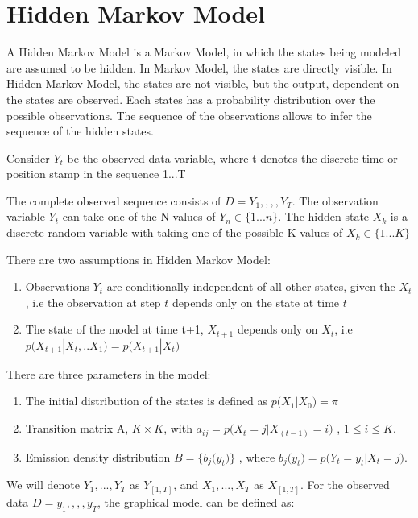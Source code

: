 \documentclass{article} %
\begin{document}
\section{Hidden Markov Model}
\label{HMM}

A Hidden Markov Model is a Markov Model, in which the states being modeled are assumed to be hidden. In Markov Model, the states are directly visible. In Hidden Markov Model, the states are not visible, but the output, dependent on the states are observed. Each states has a probability distribution over the possible observations. The sequence of the observations allows to infer the sequence of the hidden states. 

Consider \(Y_t\) be the observed data variable, where t denotes the discrete time or position stamp in the sequence 1...T

The complete observed sequence consists of \(D ={Y_1,,,,Y_T}\). The observation variable $Y_t$ can take one of the N values of \(Y_n \in \{1...n\}\). The hidden state \(X_k\) is a discrete random variable with taking one of the possible K values of \(X_k \in \{1...K\}\)

There are two assumptions in Hidden Markov Model:
\begin{enumerate}
\item Observations $Y_t$ are conditionally independent of all other states, given the \(X_t\), i.e the observation at step \(t\) depends only on the state at time \(t\)
\item The state of the model at time t+1, \(X_{t+1}\) depends only on \(X_t\), i.e 
\( p\big(X_{t+1}|X_t,..X_1\big) = p\big(X_{t+1}|X_t\big) \)
\end{enumerate}

There are three parameters in the model:
\begin{enumerate}
\item The initial distribution of the states is defined as \(p\big(X_1|X_0 \big) = \pi\)
\item Transition matrix A, \(K \times K \), with \(a_{ij} = p\big(X_t=j|X_(t-1)=i\big)\) , \(1\leq i \leq K \).
\item Emission density distribution \(B = \{b_{j}\big(y_t\big)\}\) , where \(b_{j}\big(y_t\big) = p\big(Y_t=y_t|X_t=j\big)\).
\end{enumerate}

We will denote \(Y_1,...,Y_T\) as \(Y_{[1,T]}\), and \(X_1,...,X_T\) as \(X_{[1,T]}\). For the observed data \(D ={y_1,,,,y_T}\), the graphical model can be defined as:
\end{document}
